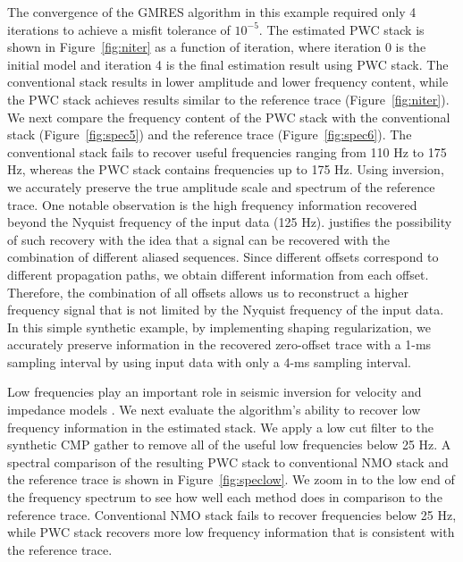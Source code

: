 The convergence of the GMRES algorithm in this example required only 4 iterations to achieve a misfit tolerance 
of $10^{-5}$. The estimated PWC stack is shown in Figure~\ref{fig:niter} as a function of iteration, where iteration 0 is the initial model
and iteration 4 is the final estimation result using PWC stack. The conventional stack
results in lower amplitude and lower frequency content, while the PWC stack achieves results similar to the reference trace (Figure~\ref{fig:niter}).
We next compare the frequency content of the PWC stack with the conventional stack (Figure~\ref{fig:spec5}) and the 
reference trace (Figure~\ref{fig:spec6}). The conventional stack fails to recover useful frequencies ranging 
from 110 Hz to 175 Hz, whereas the PWC stack contains frequencies up to 175 Hz. Using inversion, we 
accurately preserve the true amplitude scale and spectrum of the reference trace.
One notable observation is the high frequency information recovered beyond
the Nyquist frequency of the input data (125 Hz). \cite{ronen2} justifies the possibility of such recovery with the
idea that a signal can be recovered with the combination of different aliased sequences. Since different offsets
correspond to different propagation paths, we obtain different information from each offset. Therefore,
the combination of all offsets allows us to reconstruct a higher frequency signal that is not limited
by the Nyquist frequency of the input data. In this simple synthetic example, by implementing shaping 
regularization, we accurately preserve information in the recovered zero-offset trace with a 1-ms sampling 
interval by using input data with only a 4-ms sampling interval. 



Low frequencies play an important role in seismic inversion for velocity and impedance models \cite[]{kroode}.
We next evaluate the algorithm's ability to recover low frequency information in the 
estimated stack. We apply a low cut filter to the synthetic CMP gather to remove all of the useful low frequencies below 25 Hz.
A spectral comparison of the resulting PWC stack to conventional NMO stack
and the reference trace is shown in Figure~\ref{fig:speclow}. We zoom in to the low end of the frequency spectrum
to see how well each method does in comparison to the reference trace. Conventional NMO stack fails
to recover frequencies below 25 Hz, while PWC stack recovers more low frequency information that is consistent with the reference trace. 

